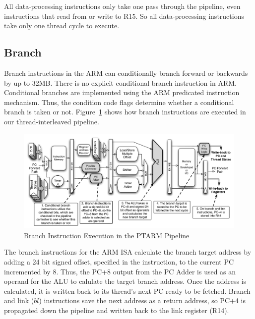 All data-processing instructions only take one pass through the pipeline, even instructions that read from or write to R15.
So all data-processing instructions take only one thread cycle to execute. 

\subsection{Branch}
Branch instructions in the ARM can conditionally branch forward or backwards by up to 32MB.
There is no explicit conditional branch instruction in ARM.
Conditional branches are implemented using the ARM predicated instruction mechanism.
Thus, the condition code flags determine whether a conditional branch is taken or not. 
Figure~\ref{fig:branch_pipeline_implementation} shows how branch instructions are executed in our thread-interleaved pipeline.

\begin{figure}[h]
  
  \begin{center}
    \includegraphics[scale=.54]{figs/branch_pipeline_implementation}
  \end{center}
  \vspace{-3mm}
  \caption{Branch Instruction Execution in the PTARM Pipeline}
  \label{fig:branch_pipeline_implementation}
\end{figure}

The branch instructions for the ARM ISA calculate the branch target address by adding a 24 bit signed offset, specified in the instruction, to the current PC incremented by 8. 
Thus, the PC+8 output from the PC Adder is used as an operand for the ALU to calulate the target branch address.  
Once the address is calculated, it is written back to its thread's next PC ready to be fetched.
Branch and link ($bl$) instructions save the next address as a return address, so PC+4 is propagated down the pipeline and written back to the link register (R14).  

